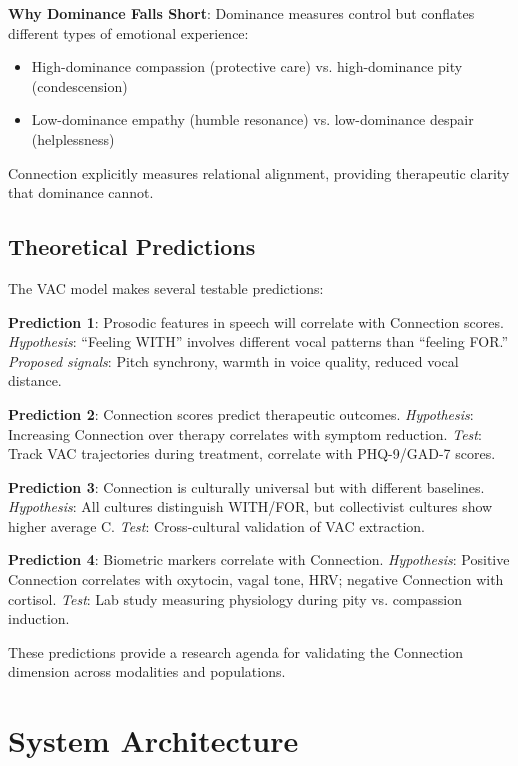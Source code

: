 \documentclass[10pt,twocolumn]{article}
\begin{document}
\textbf{Why Dominance Falls Short}: Dominance measures control but conflates different types of emotional experience:
\begin{itemize}
    \item High-dominance compassion (protective care) vs. high-dominance pity (condescension)
    \item Low-dominance empathy (humble resonance) vs. low-dominance despair (helplessness)
\end{itemize}

Connection explicitly measures relational alignment, providing therapeutic clarity that dominance cannot.

\subsection{Theoretical Predictions}

The VAC model makes several testable predictions:

\textbf{Prediction 1}: Prosodic features in speech will correlate with Connection scores. \textit{Hypothesis}: ``Feeling WITH'' involves different vocal patterns than ``feeling FOR.'' \textit{Proposed signals}: Pitch synchrony, warmth in voice quality, reduced vocal distance.

\textbf{Prediction 2}: Connection scores predict therapeutic outcomes. \textit{Hypothesis}: Increasing Connection over therapy correlates with symptom reduction. \textit{Test}: Track VAC trajectories during treatment, correlate with PHQ-9/GAD-7 scores.

\textbf{Prediction 3}: Connection is culturally universal but with different baselines. \textit{Hypothesis}: All cultures distinguish WITH/FOR, but collectivist cultures show higher average C. \textit{Test}: Cross-cultural validation of VAC extraction.

\textbf{Prediction 4}: Biometric markers correlate with Connection. \textit{Hypothesis}: Positive Connection correlates with oxytocin, vagal tone, HRV; negative Connection with cortisol. \textit{Test}: Lab study measuring physiology during pity vs. compassion induction.

These predictions provide a research agenda for validating the Connection dimension across modalities and populations.

\section{System Architecture}
\label{sec:architecture}
\end{document}
